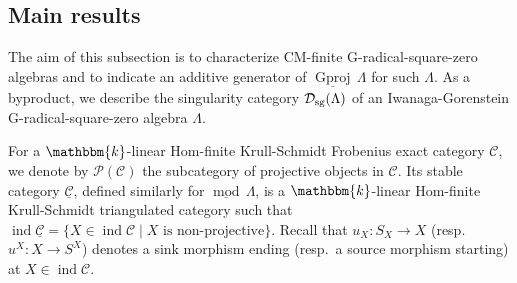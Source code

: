 \documentclass[12pt]{amsart}
\numberwithin{equation}{subsection}
\theoremstyle{plain}
\theoremstyle{definition}
\newcommand{\Proj}{\mathcal{P}}
\newcommand{\sGproj}{\underline{\operatorname{Gproj}}\,}
\newcommand{\ind}{\operatorname{ind}}
\newcommand{\smod}{\underline{\operatorname{mod}}\,}
\renewcommand{\L}{\Lambda}
\newcommand{\D}{\mathcal{D}}
\newcommand{\C}{\mathcal{C}}
\newcommand{\sC}{\underline{\mathcal{C}}}
\begin{document}




\subsection{Main results} 



The aim of this subsection is to characterize CM-finite G-radical-square-zero algebras and to indicate an additive generator of $\sGproj\L$ for such $\L$.
As a byproduct, we describe the singularity category $\D_{\rm sg}(\L)$ of an Iwanaga-Gorenstein G-radical-square-zero algebra $\L$.




For a $\mathbbm{k}$-linear Hom-finite Krull-Schmidt Frobenius exact category $\C$, we denote by $\Proj(\C)$ the subcategory of projective objects in $\C$.
Its stable category $\sC$, defined similarly for $\smod\L$, is a $\mathbbm{k}$-linear Hom-finite Krull-Schmidt triangulated category such that $\ind\sC=\{X\in\ind\C \mid X \text{ is non-projective}\}$.
Recall that $u_X: S_X \to X$ (resp.~$u^X: X\to S^X$) denotes a sink morphism ending (resp.~a source morphism starting) at $X\in\ind\C$. 
\end{document}
